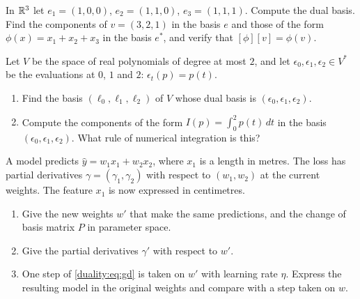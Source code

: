 \begin{notechapter}
\begin{exercise}\label{duality:exr:1}
In $\mathbb{R}^3$ let $e_1 = (1, 0, 0)$, $e_2 = (1, 1, 0)$, $e_3 = (1, 1, 1)$.
Compute the dual basis. Find the components of $v = (3, 2, 1)$ in the
basis $e$ and those of the form $\phi(x) = x_1 + x_2 + x_3$ in the basis
$e^*$, and verify that $[\phi][v] = \phi(v)$.
\end{exercise}

\begin{exercise}\label{duality:exr:2}
Let $V$ be the space of real polynomials of degree at most $2$, and let
$\epsilon_0, \epsilon_1, \epsilon_2\in V^*$ be the evaluations at $0$, $1$
and $2$: $\epsilon_t(p) = p(t)$.
\begin{enumerate}[nosep]
  \item Find the basis $(\ell_0, \ell_1, \ell_2)$ of $V$ whose dual basis
        is $(\epsilon_0, \epsilon_1, \epsilon_2)$.
  \item Compute the components of the form $I(p) = \int_0^2p(t)\,dt$ in
        the basis $(\epsilon_0, \epsilon_1, \epsilon_2)$. What rule of
        numerical integration is this?
\end{enumerate}
\end{exercise}

\begin{exercise}\label{duality:exr:3}
A model predicts $\hat y = w_1x_1 + w_2x_2$, where $x_1$ is a length in
metres. The loss has partial derivatives $\gamma = (\gamma_1, \gamma_2)$
with respect to $(w_1, w_2)$ at the current weights. The feature $x_1$ is
now expressed in centimetres.
\begin{enumerate}[nosep]
  \item Give the new weights $w'$ that make the same predictions, and the
        change of basis matrix $P$ in parameter space.
  \item Give the partial derivatives $\gamma'$ with respect to $w'$.
  \item One step of \eqref{duality:eq:gd} is taken on $w'$ with learning
        rate $\eta$. Express the resulting model in the original weights
        and compare with a step taken on $w$.
\end{enumerate}
\end{exercise}


\end{notechapter}
